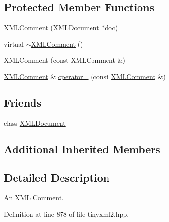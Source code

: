 \subsection*{Protected Member Functions}
\begin{DoxyCompactItemize}
\item 
\hyperlink{classtinyxml2_1_1_x_m_l_comment_ae6463adc3edd93a8e5a9b2b7e99cdf91}{X\-M\-L\-Comment} (\hyperlink{classtinyxml2_1_1_x_m_l_document}{X\-M\-L\-Document} $\ast$doc)
\item 
virtual \hyperlink{classtinyxml2_1_1_x_m_l_comment_ab592f69b47852455c1b32c5e31e453d0}{$\sim$\-X\-M\-L\-Comment} ()
\item 
\hyperlink{classtinyxml2_1_1_x_m_l_comment_aa0a9aae0850ac0e70d3cd20f6cb44447}{X\-M\-L\-Comment} (const \hyperlink{classtinyxml2_1_1_x_m_l_comment}{X\-M\-L\-Comment} \&)
\item 
\hyperlink{classtinyxml2_1_1_x_m_l_comment}{X\-M\-L\-Comment} \& \hyperlink{classtinyxml2_1_1_x_m_l_comment_ac8de55f8381d110740772e6bf6f5755a}{operator=} (const \hyperlink{classtinyxml2_1_1_x_m_l_comment}{X\-M\-L\-Comment} \&)
\end{DoxyCompactItemize}
\subsection*{Friends}
\begin{DoxyCompactItemize}
\item 
class \hyperlink{classtinyxml2_1_1_x_m_l_comment_a4eee3bda60c60a30e4e8cd4ea91c4c6e}{X\-M\-L\-Document}
\end{DoxyCompactItemize}
\subsection*{Additional Inherited Members}


\subsection{Detailed Description}
An \hyperlink{namespace_x_m_l}{X\-M\-L} Comment. 

Definition at line 878 of file tinyxml2.\-hpp.



